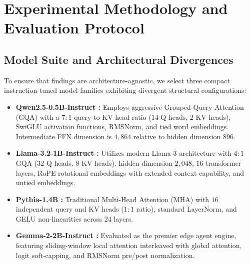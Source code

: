 \documentclass[12pt,a4paper,oneside]{report}
\begin{document}
\chapter{Experimental Methodology and Evaluation Protocol}

\section{Model Suite and Architectural Divergences}
To ensure that findings are architecture-agnostic, we select three compact instruction-tuned model families exhibiting divergent structural configurations:
\begin{itemize}[leftmargin=*]
    \item \textbf{Qwen2.5-0.5B-Instruct \cite{qwen2024}:} Employs aggressive Grouped-Query Attention (GQA) with a $7:1$ query-to-KV head ratio ($14$ Q heads, $2$ KV heads), SwiGLU activation functions, RMSNorm, and tied word embeddings. Intermediate FFN dimension is $4,864$ relative to hidden dimension $896$.
    \item \textbf{Llama-3.2-1B-Instruct \cite{dubey2024llama}:} Utilizes modern Llama-3 architecture with $4:1$ GQA ($32$ Q heads, $8$ KV heads), hidden dimension $2,048$, $16$ transformer layers, RoPE rotational embeddings with extended context capability, and untied embeddings.
    \item \textbf{Pythia-1.4B \cite{biderman2023pythia}:} Traditional Multi-Head Attention (MHA) with $16$ independent query and KV heads ($1:1$ ratio), standard LayerNorm, and GELU non-linearities across $24$ layers.
    \item \textbf{Gemma-2-2B-Instruct \cite{team2024gemma}:} Evaluated as the premier edge agent engine, featuring sliding-window local attention interleaved with global attention, logit soft-capping, and RMSNorm pre/post normalization.
\end{itemize}
\end{document}
